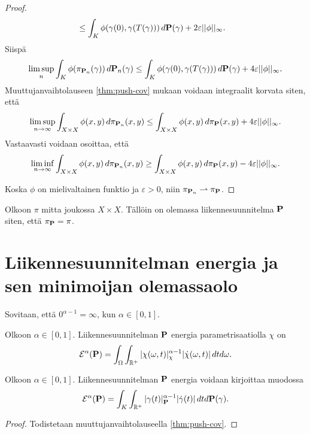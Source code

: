 \begin{proof}
\begin{align*}
        &\le \int_{K} \phi(\gamma(0),\gamma(T(\gamma))) \, d\P (\gamma) + 2\varepsilon||\phi||_\infty.
    \end{align*}
Siispä
    \begin{equation*}
        \limsup_{n} \int_{K} \phi(\pi_{\P_n}(\gamma)) \, d\P_n (\gamma) \le \int_{K} \phi(\gamma(0),\gamma(T(\gamma))) \, d\P (\gamma) + 4\varepsilon||\phi||_\infty.
    \end{equation*}
Muuttujanvaihtolauseen \ref{thm:push-cov} mukaan voidaan integraalit korvata siten, että
    \begin{equation*}
        \limsup_{n\to\infty} \int_{X \times X} \phi(x, y) \, d\pi_{\P_n} (x, y) \le \int_{X \times X} \phi(x, y) \, d\pi_{\P} (x, y) + 4\varepsilon||\phi||_\infty.
    \end{equation*}
Vastaavasti voidaan osoittaa, että 
    \begin{equation*}
        \liminf_{n\to\infty} \int_{X \times X} \phi(x, y) \, d\pi_{\P_n} (x, y) \ge \int_{X \times X} \phi(x, y) \, d\pi_{\P} (x, y) - 4\varepsilon||\phi||_\infty.
    \end{equation*}

Koska $\phi$ on mielivaltainen funktio ja $\varepsilon > 0$, niin $\pi_{\P_n} \rightharpoonup \pi_\P$.
\end{proof}

\begin{corollary}
    Olkoon $\pi$ mitta joukossa $X \times X$. Tällöin on olemassa liikennesuunnitelma $\P$ siten, että $\pi_\P = \pi$.
\end{corollary}

\section{Liikennesuunnitelman energia ja sen minimoijan olemassaolo}
 Sovitaan, että $0^{\alpha - 1} = \infty$, kun $\alpha \in [0, 1]$.

\begin{definition}\label{def:energyOfP}
    Olkoon $\alpha \in [0, 1].$ Liikennesuunnitelman $\P$ energia parametrisaatiolla $\chi$ on 
        \begin{equation*}
            \E^\alpha(\P) = \int_\Omega \int_{\R^+} |\chi(\omega, t)|_\chi^{\alpha-1}|\dot \chi(\omega, t)|\, dtd\omega.
        \end{equation*}
\end{definition}
    
\begin{remark}\label{thm:energyOfPIndependent}
    Olkoon $\alpha \in [0, 1].$ Liikennesuunnitelman $\P$ energia voidaan kirjoittaa muodossa
    \begin{equation*}
        \E^\alpha(\P) = \int_K \int_{\R^+}|\gamma(t)|^{\alpha-1}_\P|\dot\gamma(t)| \, dtd\P(\gamma).
    \end{equation*}
\end{remark}
\begin{proof}
    Todistetaan muuttujanvaihtolauseella \ref{thm:push-cov}.
\end{proof}

